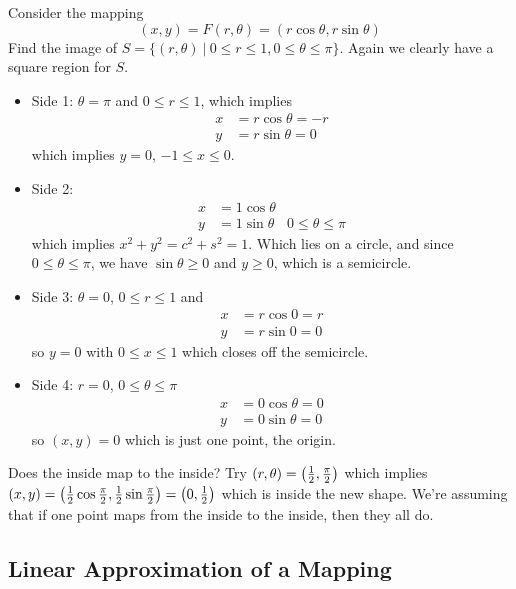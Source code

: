 \documentclass[english, 11pt]{article}
\begin{document}
\begin{exmp}
  Consider the mapping
  \[ (x,y) = F(r,\theta) = (r\cos\theta, r\sin\theta) \]
  Find the image of $S = \{(r,\theta) \ | \ 0 \leq r \leq 1, 0 \leq \theta \leq \pi\}$.
  Again we clearly have a square region for $S$. \\

  \begin{itemize}
    \item Side 1: $\theta = \pi$ and $0 \leq r \leq 1$, which implies
    \begin{align*}
      x & = r\cos\theta = -r \\
      y & = r\sin\theta = 0
    \end{align*}
    which implies $y = 0$, $-1 \leq x \leq 0$.
    \item Side 2:
    \begin{align*}
      x & = 1\cos\theta \\
      y & = 1\sin\theta & 0 \leq \theta \leq \pi
    \end{align*}
    which implies $x^2 + y^2 = c^2 + s^2 = 1$. Which lies on a circle, and since $0 \leq \theta \leq \pi$, we have $\sin\theta \geq 0$ and $y \geq 0$, which is a semicircle.
    \item Side 3: $\theta = 0$, $0 \leq r \leq 1$ and
    \begin{align*}
      x & = r\cos0 = r \\
      y & = r\sin0 = 0
    \end{align*}
    so $y = 0$ with $0 \leq x \leq 1$ which closes off the semicircle.
    \item Side 4: $r = 0$, $0 \leq \theta \leq \pi$
    \begin{align*}
      x & = 0\cos\theta = 0 \\
      y & = 0\sin\theta = 0
    \end{align*}
    so $(x,y) = 0$ which is just one point, the origin.
  \end{itemize}
  Does the inside map to the inside? Try $(r, \theta) = \left( \frac{1}{2}, \frac{\pi}{2} \right)$ which implies $(x,y) = \left( \frac{1}{2}\cos\frac{\pi}{2}, \frac{1}{2}\sin\frac{\pi}{2} \right) = \left( 0, \frac{1}{2} \right)$ which is inside the new shape. We're assuming that if one point maps from the inside to the inside, then they all do.
\end{exmp}

\subsection{Linear Approximation of a Mapping}
\end{document}
